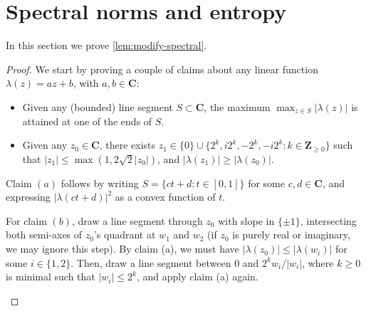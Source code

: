 \documentclass[reqno,11pt]{amsart}
\theoremstyle{definition}
\theoremstyle{remark}
\numberwithin{equation}{section}
\newcommand{\Z}{\mathbf{Z}}
\newcommand{\C}{\mathbf{C}}
\renewcommand{\Re}{\textnormal{Re}}
\renewcommand{\Im}{\textnormal{Im}}
\begin{document}


\appendix

\section{Spectral norms and entropy} \label{sec:spectral-norms-entropy}

In this section we prove \cref{lem:modify-spectral}.

\begin{proof}
We start by proving a couple of claims about any linear function $\lambda(z) = az + b$, with $a, b \in \C$:
\begin{itemize}
    \item[(a).] Given any (bounded) line segment $S \subset \C$, the maximum $\max_{z \in S} |\lambda(z)|$ is attained at one of the ends of $S$.
    \item[(b).] Given any $z_0 \in \C$, there exists
    $z_1 \in \{0\} \cup \{2^k, i2^k, -2^k, -i2^k : k \in \Z_{\ge 0}\}$ such that $|z_1| \le \max(1, 2\sqrt{2}|z_0|)$, and $|\lambda(z_1)| \ge |\lambda(z_0)|$.
\end{itemize}

Claim $(a)$ follows by writing $S = \{ct + d : t \in [0, 1]\}$ for some $c, d \in \C$, and expressing $|\lambda(ct+d)|^2$ as a convex function of $t$. 

For claim $(b)$, draw a line segment through $z_0$ with slope in $\{\pm 1\}$, intersecting both semi-axes of $z_0$'s quadrant at $w_1$ and $w_2$ (if $z_0$ is purely real or imaginary, we may ignore this step). By claim (a), we must have $|\lambda(z_0)| \le |\lambda(w_i)|$ for some $i \in \{1, 2\}$. Then, draw a line segment between $0$ and $2^k w_i/|w_i|$, where $k \ge 0$ is minimal such that $|w_i| \le 2^k$, and apply claim (a) again.
\begin{figure}[ht]
\begin{center}
\end{center}
\end{figure}
\end{proof}
\end{document}
